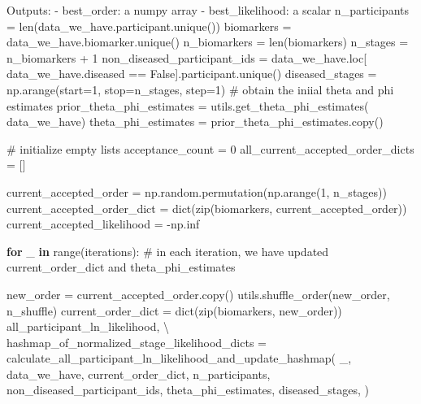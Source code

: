 \documentclass[
  letterpaper,
  DIV=11,
  numbers=noendperiod]{scrreprt}
\newenvironment{Shaded}{\begin{snugshade}}{\end{snugshade}}
\newcommand{\BuiltInTok}[1]{\textcolor[rgb]{0.00,0.23,0.31}{#1}}
\newcommand{\CommentTok}[1]{\textcolor[rgb]{0.37,0.37,0.37}{#1}}
\newcommand{\ControlFlowTok}[1]{\textcolor[rgb]{0.00,0.23,0.31}{\textbf{#1}}}
\newcommand{\DecValTok}[1]{\textcolor[rgb]{0.68,0.00,0.00}{#1}}
\newcommand{\KeywordTok}[1]{\textcolor[rgb]{0.00,0.23,0.31}{\textbf{#1}}}
\newcommand{\NormalTok}[1]{\textcolor[rgb]{0.00,0.23,0.31}{#1}}
\newcommand{\OperatorTok}[1]{\textcolor[rgb]{0.37,0.37,0.37}{#1}}
\newcommand{\VariableTok}[1]{\textcolor[rgb]{0.07,0.07,0.07}{#1}}
\begin{document}
\begin{Shaded}
\begin{Highlighting}[]
\CommentTok{    Outputs:}
\CommentTok{        {-} best\_order: a numpy array}
\CommentTok{        {-} best\_likelihood: a scalar }
\CommentTok{    \textquotesingle{}\textquotesingle{}\textquotesingle{}}
\NormalTok{    n\_participants }\OperatorTok{=} \BuiltInTok{len}\NormalTok{(data\_we\_have.participant.unique())}
\NormalTok{    biomarkers }\OperatorTok{=}\NormalTok{ data\_we\_have.biomarker.unique()}
\NormalTok{    n\_biomarkers }\OperatorTok{=} \BuiltInTok{len}\NormalTok{(biomarkers)}
\NormalTok{    n\_stages }\OperatorTok{=}\NormalTok{ n\_biomarkers }\OperatorTok{+} \DecValTok{1}
\NormalTok{    non\_diseased\_participant\_ids }\OperatorTok{=}\NormalTok{ data\_we\_have.loc[}
\NormalTok{        data\_we\_have.diseased }\OperatorTok{==} \VariableTok{False}\NormalTok{].participant.unique()}
\NormalTok{    diseased\_stages }\OperatorTok{=}\NormalTok{ np.arange(start}\OperatorTok{=}\DecValTok{1}\NormalTok{, stop}\OperatorTok{=}\NormalTok{n\_stages, step}\OperatorTok{=}\DecValTok{1}\NormalTok{)}
    \CommentTok{\# obtain the iniial theta and phi estimates}
\NormalTok{    prior\_theta\_phi\_estimates }\OperatorTok{=}\NormalTok{ utils.get\_theta\_phi\_estimates(}
\NormalTok{        data\_we\_have)}
\NormalTok{    theta\_phi\_estimates }\OperatorTok{=}\NormalTok{ prior\_theta\_phi\_estimates.copy()}

    \CommentTok{\# initialize empty lists}
\NormalTok{    acceptance\_count }\OperatorTok{=} \DecValTok{0}
\NormalTok{    all\_current\_accepted\_order\_dicts }\OperatorTok{=}\NormalTok{ []}

\NormalTok{    current\_accepted\_order }\OperatorTok{=}\NormalTok{ np.random.permutation(np.arange(}\DecValTok{1}\NormalTok{, n\_stages))}
\NormalTok{    current\_accepted\_order\_dict }\OperatorTok{=} \BuiltInTok{dict}\NormalTok{(}\BuiltInTok{zip}\NormalTok{(biomarkers, current\_accepted\_order))}
\NormalTok{    current\_accepted\_likelihood }\OperatorTok{=} \OperatorTok{{-}}\NormalTok{np.inf}

    \ControlFlowTok{for}\NormalTok{ \_ }\KeywordTok{in} \BuiltInTok{range}\NormalTok{(iterations):}
        \CommentTok{\# in each iteration, we have updated current\_order\_dict and theta\_phi\_estimates}

\NormalTok{        new\_order }\OperatorTok{=}\NormalTok{ current\_accepted\_order.copy()}
\NormalTok{        utils.shuffle\_order(new\_order, n\_shuffle)}
\NormalTok{        current\_order\_dict }\OperatorTok{=} \BuiltInTok{dict}\NormalTok{(}\BuiltInTok{zip}\NormalTok{(biomarkers, new\_order))}
\NormalTok{        all\_participant\_ln\_likelihood, }\OperatorTok{\textbackslash{}}
\NormalTok{            hashmap\_of\_normalized\_stage\_likelihood\_dicts }\OperatorTok{=}\NormalTok{ calculate\_all\_participant\_ln\_likelihood\_and\_update\_hashmap(}
\NormalTok{                \_,}
\NormalTok{                data\_we\_have,}
\NormalTok{                current\_order\_dict,}
\NormalTok{                n\_participants,}
\NormalTok{                non\_diseased\_participant\_ids,}
\NormalTok{                theta\_phi\_estimates,}
\NormalTok{                diseased\_stages,}
\NormalTok{            )}


\end{Highlighting}
\end{Shaded}
\end{document}

